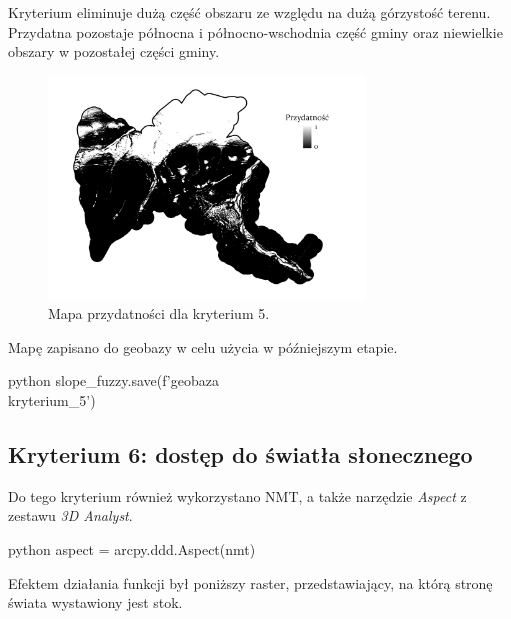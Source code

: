 \documentclass{article}
\begin{document}
Kryterium eliminuje dużą część obszaru ze względu na dużą górzystość terenu. Przydatna pozostaje północna i północno-wschodnia część gminy oraz niewielkie obszary w pozostałej części gminy.
\vspace{5pt}

\begin{figure}[H]
    \centering
    \includegraphics[width=0.75\textwidth]{img/kryterium5-layout.jpg}
    \caption{Mapa przydatności dla kryterium 5.}
\end{figure}
\vspace{10pt}

Mapę zapisano do geobazy w celu użycia w późniejszym etapie.
\vspace{5pt}

\begin{mintedbox}{python}
slope_fuzzy.save(f'{geobaza}\\kryterium_5')
\end{mintedbox}
\newpage

\subsection{Kryterium 6: dostęp do światła słonecznego}

Do tego kryterium również wykorzystano NMT, a także narzędzie \textit{Aspect} z zestawu \textit{3D Analyst}.
\vspace{5pt}

\begin{mintedbox}{python}
aspect = arcpy.ddd.Aspect(nmt)
\end{mintedbox}
\vspace{10pt}

Efektem działania funkcji był poniższy raster, przedstawiający, na którą stronę świata wystawiony jest stok.
\vspace{5pt}
\end{document}
